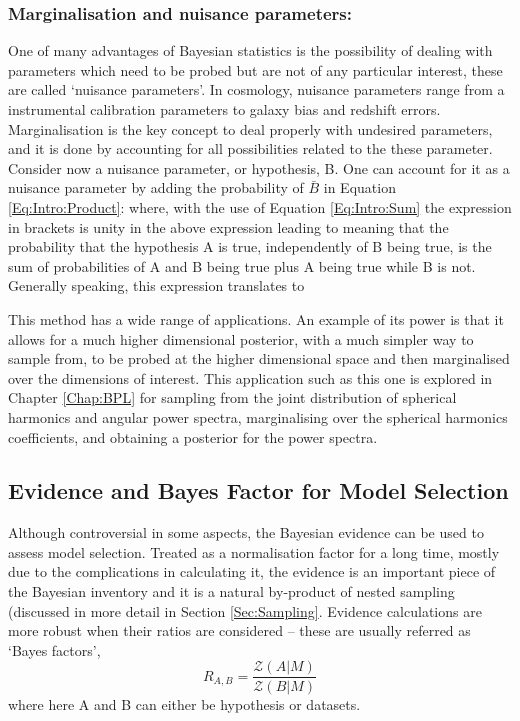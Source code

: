 \subsubsection{Marginalisation and nuisance parameters:}
One of many advantages of Bayesian statistics is the possibility of dealing with parameters which need to be probed but are not of any particular interest, these are called `nuisance parameters'. In cosmology, nuisance parameters range from a instrumental calibration parameters to galaxy bias and redshift errors. Marginalisation is the key concept to deal properly with undesired parameters, and it is done by accounting for all possibilities related to the these parameter. Consider now a nuisance parameter, or hypothesis, B. One can account for it as a nuisance parameter by adding the probability of $\bar{B}$ in Equation \eqref{Eq:Intro:Product}:
where, with the use of Equation \eqref{Eq:Intro:Sum} the expression in brackets is unity in the above expression leading to
meaning that the probability that the hypothesis A is true, independently of B being true, is the sum of probabilities of A and B being true plus A being true while B is not. Generally speaking, this expression translates to

\qquad This method has a wide range of applications. An example of its power is that it allows for a much higher dimensional posterior, with a much simpler way to sample from, to be probed at the higher dimensional space and then marginalised over the dimensions of interest. This application such as this one is explored in Chapter \ref{Chap:BPL} for sampling from the joint distribution of spherical harmonics and angular power spectra, marginalising over the spherical harmonics coefficients, and obtaining a posterior for the power spectra.

\subsection{Evidence and Bayes Factor for Model Selection}
Although controversial in some aspects, the Bayesian evidence can be used to assess model selection. Treated as a normalisation factor for a long time, mostly due to the complications in calculating it, the evidence is an important piece of the Bayesian inventory and it is a natural by-product of nested sampling (discussed in more detail in Section \ref{Sec:Sampling}. Evidence calculations are more robust when their ratios are considered -- these are usually referred as `Bayes factors',
\begin{equation}
R_{A,B} = \frac{\mathcal{Z}(A|M)}{\mathcal{Z}(B|M)}
\label{Eq:Intro:BayesFactor}
\end{equation}
where here A and B can either be hypothesis or datasets. 

